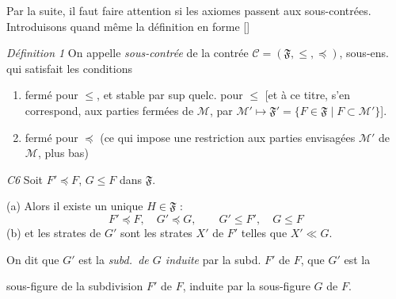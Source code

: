 \documentclass[11pt,a4paper]{article}
\begin{document}
Par la suite, il faut faire attention si les axiomes \ill{} passent aux sous-contrées. Introduisons quand même la définition en forme [\ill{}]

\emph{Définition 1} \quad On appelle \emph{sous-contrée} de la contrée $\mathcal{C} = (\mathfrak{F}, \leq, \preccurlyeq)$,  sous-ens. qui satisfait les conditions
\begin{enumerate}
  \item[a)] fermé pour $\leq$, et stable par sup quelc. pour $\leq$ [et à ce titre, s'en correspond,  aux parties fermées  de $\mathcal{M}$, par $\mathcal{M}' \mapsto \mathfrak{F}' = \lbrace F \in \mathfrak{F} \mid F \subset \mathcal{M}' \rbrace$].
  \item[b)] fermé pour $\preccurlyeq$ (ce qui impose une restriction aux parties envisagées $\mathcal{M}'$ de $\mathcal{M}$, \ill{} plus bas) 
\end{enumerate}

\emph{C6} \quad Soit $F' \preccurlyeq F$, $G \leq F$ dans $\mathfrak{F}$.

(a) Alors il existe un unique $H \in \mathfrak{F}$ \ill{} :
\[
  F' \preccurlyeq F , \quad G' \preccurlyeq G , \qquad G' \leq F' , \quad G \leq F
\]
(b) et les strates de $G'$ sont les strates $X'$ de $F'$ telles que $X' \ll G$.

On dit que $G'$ est la \emph{subd.\ de $G$ induite} par la subd. $F'$ de $F$, \ill{} que $G'$ est la 

sous-figure de \struck{\ill{}} la subdivision $F'$ de $F$, induite par la sous-figure $G$ de $F$.
\marginal{\ill{} \ill{} \ill{}}
\end{document}
